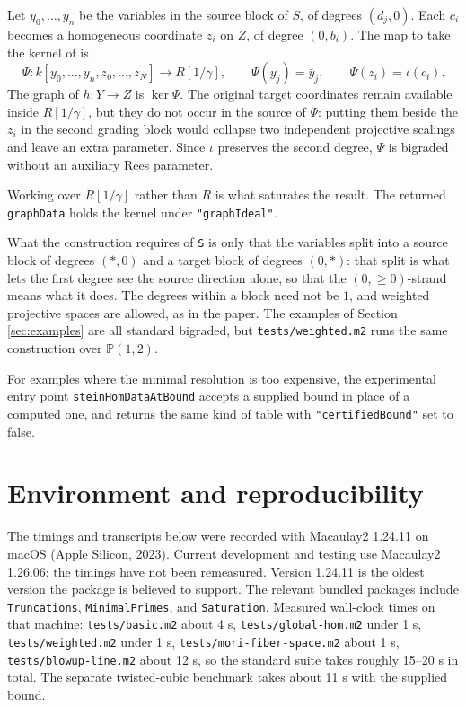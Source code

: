\documentclass[11pt,reqno]{amsart}
\newcommand{\PP}{\ensuremath{\mathbb{P}}}
\theoremstyle{plain}
\theoremstyle{definition}
\begin{document}
Let \(y_0,\dots,y_n\) be the variables in the source block of \(S\), of
degrees \((d_j,0)\). Each \(c_i\) becomes a homogeneous coordinate \(z_i\)
on \(Z\), of degree \((0,b_i)\). The map to take the kernel of is
\[\Psi\colon k[y_0,\dots,y_n,z_0,\dots,z_N]\longrightarrow R[1/\gamma],\qquad
\Psi(y_j)=\bar y_j,\qquad \Psi(z_i)=\iota(c_i).\]
The graph of \(h\colon Y\to Z\) is \(\ker\Psi\). The original target
coordinates remain available inside \(R[1/\gamma]\), but they do not occur
in the source of \(\Psi\): putting them beside the \(z_i\) in the second
grading block would collapse two independent projective scalings and leave
an extra parameter. Since \(\iota\) preserves the second degree, \(\Psi\) is
bigraded without an auxiliary Rees parameter.

Working over \(R[1/\gamma]\) rather than \(R\) is what saturates the
result. The returned \texttt{graphData} holds the kernel under
\texttt{"graphIdeal"}.

\medskip

What the construction requires of \texttt{S} is only that the variables
split into a source block of degrees \((\ast,0)\) and a target block of
degrees \((0,\ast)\): that split is what lets the first degree see the
source direction alone, so that the \((0,\geq0)\)-strand means what it
does. The degrees within a block need not be \(1\), and weighted
projective spaces are allowed, as in the paper. The examples of Section
\ref{sec:examples} are all standard bigraded, but
\texttt{tests/weighted.m2} runs the same construction over \(\PP(1,2)\).

For examples where the minimal resolution is too expensive, the
experimental entry point \texttt{steinHomDataAtBound} accepts a supplied
bound in place of a computed one, and returns the same kind of table with
\texttt{"certifiedBound"} set to false.

\section{Environment and reproducibility}\label{sec:reproducibility}

The timings and transcripts below were recorded with Macaulay2 1.24.11 on
macOS (Apple Silicon, 2023).  Current development and testing use Macaulay2
1.26.06; the timings have not been remeasured.  Version 1.24.11 is the oldest
version the package is believed to support.  The relevant bundled packages include
\texttt{Truncations}, \texttt{MinimalPrimes}, and \texttt{Saturation}.
Measured wall-clock times on that machine: \texttt{tests/basic.m2} about
4 s, \texttt{tests/global-hom.m2} under 1 s,
\texttt{tests/weighted.m2} under 1 s,
\texttt{tests/mori-fiber-space.m2} about 1 s,
\texttt{tests/blowup-line.m2} about 12 s, so the standard suite takes
roughly 15--20 s in total. The separate twisted-cubic benchmark takes
about 11 s with the supplied bound.
\end{document}
